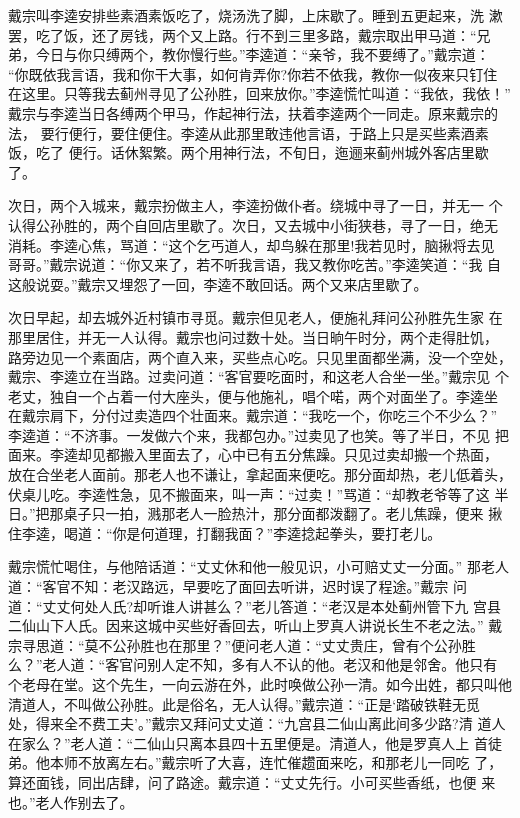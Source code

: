 戴宗叫李逵安排些素酒素饭吃了，烧汤洗了脚，上床歇了。睡到五更起来，洗
漱罢，吃了饭，还了房钱，两个又上路。行不到三里多路，戴宗取出甲马道：“兄
弟，今日与你只缚两个，教你慢行些。”李逵道：“亲爷，我不要缚了。”戴宗道：
“你既依我言语，我和你干大事，如何肯弄你?你若不依我，教你一似夜来只钉住
在这里。只等我去蓟州寻见了公孙胜，回来放你。”李逵慌忙叫道：“我依，我依！”
戴宗与李逵当日各缚两个甲马，作起神行法，扶着李逵两个一同走。原来戴宗的法，
要行便行，要住便住。李逵从此那里敢违他言语，于路上只是买些素酒素饭，吃了
便行。话休絮繁。两个用神行法，不旬日，迤逦来蓟州城外客店里歇了。

次日，两个入城来，戴宗扮做主人，李逵扮做仆者。绕城中寻了一日，并无一
个认得公孙胜的，两个自回店里歇了。次日，又去城中小街狭巷，寻了一日，绝无
消耗。李逵心焦，骂道：“这个乞丐道人，却鸟躲在那里!我若见时，脑揪将去见
哥哥。”戴宗说道：“你又来了，若不听我言语，我又教你吃苦。”李逵笑道：“我
自这般说耍。”戴宗又埋怨了一回，李逵不敢回话。两个又来店里歇了。

次日早起，却去城外近村镇市寻觅。戴宗但见老人，便施礼拜问公孙胜先生家
在那里居住，并无一人认得。戴宗也问过数十处。当日晌午时分，两个走得肚饥，
路旁边见一个素面店，两个直入来，买些点心吃。只见里面都坐满，没一个空处，
戴宗、李逵立在当路。过卖问道：“客官要吃面时，和这老人合坐一坐。”戴宗见
个老丈，独自一个占着一付大座头，便与他施礼，唱个喏，两个对面坐了。李逵坐
在戴宗肩下，分付过卖造四个壮面来。戴宗道：“我吃一个，你吃三个不少么？”
李逵道：“不济事。一发做六个来，我都包办。”过卖见了也笑。等了半日，不见
把面来。李逵却见都搬入里面去了，心中已有五分焦躁。只见过卖却搬一个热面，
放在合坐老人面前。那老人也不谦让，拿起面来便吃。那分面却热，老儿低着头，
伏桌儿吃。李逵性急，见不搬面来，叫一声：“过卖！”骂道：“却教老爷等了这
半日。”把那桌子只一拍，溅那老人一脸热汁，那分面都泼翻了。老儿焦躁，便来
揪住李逵，喝道：“你是何道理，打翻我面？”李逵捻起拳头，要打老儿。

戴宗慌忙喝住，与他陪话道：“丈丈休和他一般见识，小可赔丈丈一分面。”
那老人道：“客官不知：老汉路远，早要吃了面回去听讲，迟时误了程途。”戴宗
问道：“丈丈何处人氏?却听谁人讲甚么？”老儿答道：“老汉是本处蓟州管下九
宫县二仙山下人氏。因来这城中买些好香回去，听山上罗真人讲说长生不老之法。”
戴宗寻思道：“莫不公孙胜也在那里？”便问老人道：“丈丈贵庄，曾有个公孙胜
么？”老人道：“客官问别人定不知，多有人不认的他。老汉和他是邻舍。他只有
个老母在堂。这个先生，一向云游在外，此时唤做公孙一清。如今出姓，都只叫他
清道人，不叫做公孙胜。此是俗名，无人认得。”戴宗道：“正是‘踏破铁鞋无觅
处，得来全不费工夫’。”戴宗又拜问丈丈道：“九宫县二仙山离此间多少路?清
道人在家么？”老人道：“二仙山只离本县四十五里便是。清道人，他是罗真人上
首徒弟。他本师不放离左右。”戴宗听了大喜，连忙催趱面来吃，和那老儿一同吃
了，算还面钱，同出店肆，问了路途。戴宗道：“丈丈先行。小可买些香纸，也便
来也。”老人作别去了。

